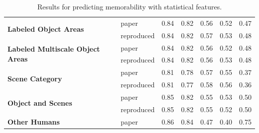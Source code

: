 \documentclass[10pt,twocolumn,letterpaper]{article}
\begin{document}
\begin{table}[tb]
\begin{tabular}{|l||l|l|l|l|l|l|}
\multirow{2}{*}{\textbf{Labeled Object Areas}}            & paper      & 0.84            & 0.82             & 0.56                & 0.52               & 0.47       \\ \cline{2-7} 
                                                          & reproduced & 0.84            & 0.82             & 0.57                & 0.53               & 0.48       \\ \hline \hline
\multirow{2}{*}{\textbf{Labeled Multiscale Object Areas}} & paper      & 0.84            & 0.82             & 0.56                & 0.52               & 0.48       \\ \cline{2-7} 
                                                          & reproduced & 0.84            & 0.82             & 0.56                & 0.53               & 0.48       \\ \hline \hline
\multirow{2}{*}{\textbf{Scene Category}}                  & paper      & 0.81            & 0.78             & 0.57                & 0.55               & 0.37       \\ \cline{2-7} 
                                                          & reproduced & 0.81            & 0.77             & 0.58                & 0.56               & 0.36       \\ \hline \hline
\multirow{2}{*}{\textbf{Object and Scenes}}               & paper      & 0.85            & 0.82             & 0.55                & 0.53               & 0.50       \\ \cline{2-7} 
                                                          & reproduced & 0.85            & 0.82             & 0.55                & 0.52               & 0.50       \\ \hline \hline
\multirow{1}{*}{\textbf{Other Humans}}               & paper      & 0.86            & 0.84             & 0.47                & 0.40               & 0.75                 \\ \hline                                            
\end{tabular}
\caption{Results for predicting memorability with statistical features.}
\label{tab:statistical_features}
\end{table}
\endgroup
\end{document}
